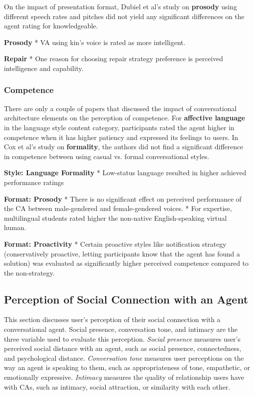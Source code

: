 On the impact of presentation format, Dubiel et al's study on \textbf{prosody} using different speech rates and pitches did not yield any significant differences on the agent rating for knowledgeable.

\textbf{Prosody}
* VA using kin's voice is rated as more intelligent. \cite{chan2021kinvoices}\cmt{[74]}

\textbf{Repair}
* One reason for choosing repair strategy preference is perceived intelligence and capability. \cite{ashktorab2019resilient}\cmt{[88]}

\subsubsection{Competence}

There are only a couple of papers that discussed the impact of conversational architecture elements on the perception of competence. For \textbf{affective language} in the language style content category, participants rated the agent higher in competence when it has higher patiency and expressed its feelings to users. In Cox et al's study on \textbf{formality}, the authors did not find a significant difference in competence between using casual vs. formal conversational styles.

\textbf{Style: Language Formality}
*  Low-status language resulted in higher achieved performance ratings \cite{habler2019effects}\cmt{[63]}

\textbf{Format: Prosody}
* There is no significant effect on perceived performance of the CA between male-gendered and female-gendered voices. \cite{habler2019effects}\cmt{[63]}
* For expertise, multilingual students rated higher the non-native English-speaking virtual human. \cite{feijoo2021effects}\cmt{[70]}

\textbf{Format: Proactivity}
* Certain proactive styles like notification strategy (conservatively proactive, letting participants know that the agent has found a solution) was evaluated as significantly higher perceived competence compared to the non-strategy. \cite{kraus2020effects}\cmt{[64]}



\subsection{Perception of Social Connection with an Agent}

This section discusses user's perception of their social connection with a conversational agent. Social presence, conversation tone, and intimacy are the three variable used to evaluate this perception. \textit{Social presence} measures user's perceived social distance with an agent, such as social presence, connectedness, and psychological distance. \textit{Conversation tone} measures user perceptions on the way an agent is speaking to them, such as appropriateness of tone, empathetic, or emotionally expressive. \textit{Intimacy} measures the quality of relationship users have with CAs, such as intimacy, social attraction, or similarity with each other.

